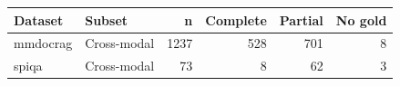 \begin{tabular}{llrrrr}
\toprule
Dataset & Subset & n & Complete & Partial & No gold \\
\midrule
mmdocrag & Cross-modal & 1237 & 528 & 701 & 8 \\
spiqa & Cross-modal & 73 & 8 & 62 & 3 \\
\bottomrule
\end{tabular}
